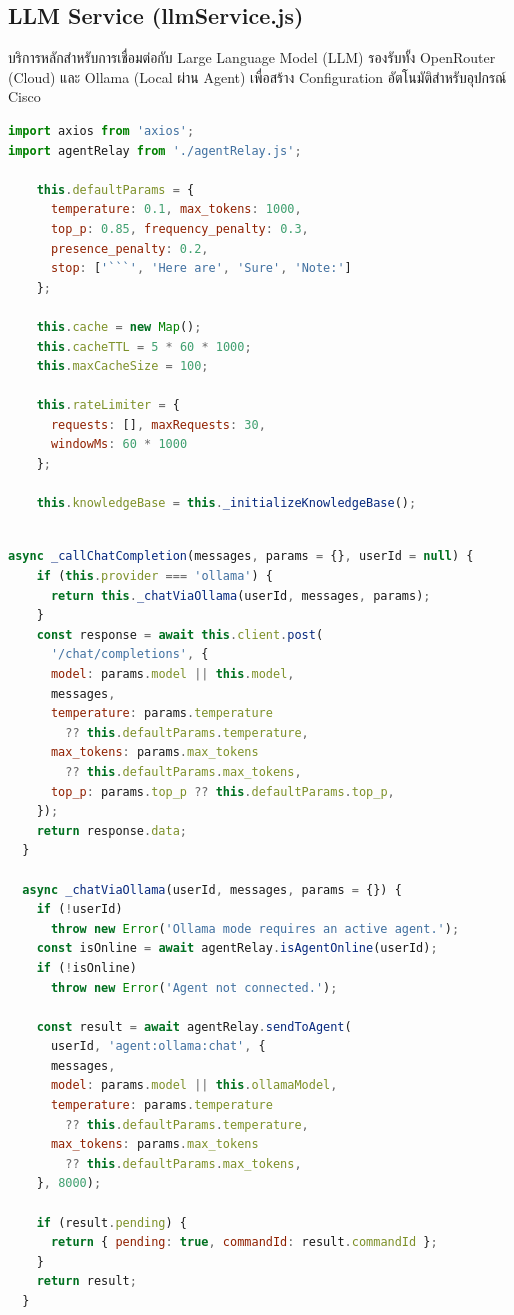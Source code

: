 \subsection{LLM Service (llmService.js)}
\hspace*{1.3em}
บริการหลักสำหรับการเชื่อมต่อกับ Large Language Model (LLM) รองรับทั้ง OpenRouter (Cloud) และ Ollama (Local ผ่าน Agent) เพื่อสร้าง Configuration อัตโนมัติสำหรับอุปกรณ์ Cisco

\begin{lstlisting}[language=JavaScript, caption={services/llmService.js -- LLM Service Class}]
import axios from 'axios';
import agentRelay from './agentRelay.js';

    this.defaultParams = {
      temperature: 0.1, max_tokens: 1000,
      top_p: 0.85, frequency_penalty: 0.3,
      presence_penalty: 0.2,
      stop: ['```', 'Here are', 'Sure', 'Note:']
    };

    this.cache = new Map();
    this.cacheTTL = 5 * 60 * 1000;
    this.maxCacheSize = 100;

    this.rateLimiter = {
      requests: [], maxRequests: 30,
      windowMs: 60 * 1000
    };

    this.knowledgeBase = this._initializeKnowledgeBase();
  
\end{lstlisting}

\begin{lstlisting}[language=JavaScript, caption={llmService.js -- Chat Completion และ Ollama Relay}]
  async _callChatCompletion(messages, params = {}, userId = null) {
    if (this.provider === 'ollama') {
      return this._chatViaOllama(userId, messages, params);
    }
    const response = await this.client.post(
      '/chat/completions', {
      model: params.model || this.model,
      messages,
      temperature: params.temperature
        ?? this.defaultParams.temperature,
      max_tokens: params.max_tokens
        ?? this.defaultParams.max_tokens,
      top_p: params.top_p ?? this.defaultParams.top_p,
    });
    return response.data;
  }

  async _chatViaOllama(userId, messages, params = {}) {
    if (!userId)
      throw new Error('Ollama mode requires an active agent.');
    const isOnline = await agentRelay.isAgentOnline(userId);
    if (!isOnline)
      throw new Error('Agent not connected.');

    const result = await agentRelay.sendToAgent(
      userId, 'agent:ollama:chat', {
      messages,
      model: params.model || this.ollamaModel,
      temperature: params.temperature
        ?? this.defaultParams.temperature,
      max_tokens: params.max_tokens
        ?? this.defaultParams.max_tokens,
    }, 8000);

    if (result.pending) {
      return { pending: true, commandId: result.commandId };
    }
    return result;
  }
\end{lstlisting}

